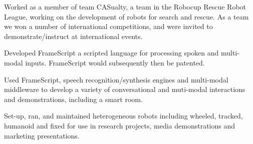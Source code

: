 \documentclass[a4paper]{awesome-deedy}
\begin{document}
\begin{minipage}[t]{0.66\textwidth}
\begin{tightemize}
\item Worked as a member of team CASualty, a team in the Robocup Rescue Robot League, working on the development of robots for search and rescue.  As a team we won a number of international competitions, and were invited to demonstrate/instruct at international events.
\item Developed FrameScript a scripted language for processing spoken and multi-modal inputs.  FrameScript would subsequently then be patented.
\item Used FrameScript, speech recognition/synthesis engines and multi-modal middleware to develop a variety of conversational and muti-modal interactions and demonstrations, including a smart room.
\item Set-up, ran, and maintained heterogeneous robots including wheeled, tracked, humanoid and fixed for use in research projects, media demonstrations and marketing presentations.
\end{tightemize}
\sectionsep


\end{minipage}
\end{document}
